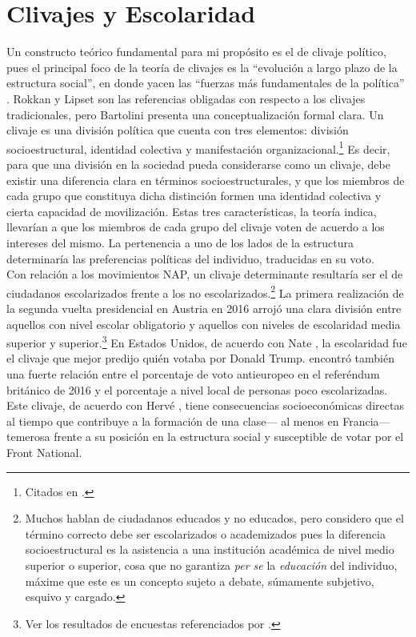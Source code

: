 \section{Clivajes y Escolaridad}

Un constructo teórico fundamental para mi propósito es el de clivaje político, pues el principal foco de la teoría de clivajes es la ``evolución a largo plazo de la estructura social'', en donde yacen las ``fuerzas más fundamentales de la política'' \parencite[4]{Bornschier09}. Rokkan y Lipset son las referencias obligadas con respecto a los clivajes tradicionales, pero Bartolini presenta una conceptualización formal clara. Un clivaje es una división política que cuenta con tres elementos: división socioestructural, identidad colectiva y manifestación organizacional.\footnote{Citados en \textcite{Bornschier09}.} Es decir, para que una división en la sociedad pueda considerarse como un clivaje, debe existir una diferencia clara en términos socioestructurales, y que los miembros de cada grupo que constituya dicha distinción formen una identidad colectiva y cierta capacidad de movilización. Estas tres características, la teoría indica, llevarían a que los miembros de cada grupo del clivaje voten de acuerdo a los intereses del mismo. La pertenencia a uno de los lados de la estructura determinaría las preferencias políticas del individuo, traducidas en su voto.\\

Con relación a los movimientos NAP, un clivaje determinante resultaría ser el de ciudadanos escolarizados frente a los no escolarizados.\footnote{Muchos hablan de ciudadanos educados y no educados, pero considero que el término correcto debe ser escolarizados o academizados pues la diferencia socioestructural es la asistencia a una institución académica de nivel medio superior o superior, cosa que no garantiza \textit{per se} la \textit{educación} del individuo, máxime que este es un concepto sujeto a debate, súmamente subjetivo, esquivo y cargado.} La primera realización de la segunda vuelta presidencial en Austria en 2016 arrojó una clara división entre aquellos con nivel escolar obligatorio y aquellos con niveles de escolaridad media superior y superior.\footnote{Ver los resultados de encuestas referenciados por \textcite{Hoare16}.} En Estados Unidos, de acuerdo con Nate \textcite{Silver16}, la escolaridad fue el clivaje que mejor predijo quién votaba por Donald Trump. \textcite{Rae16} encontró también una fuerte relación entre el porcentaje de voto antieuropeo en el referéndum británico de 2016 y el porcentaje a nivel local de personas poco escolarizadas. Este clivaje, de acuerdo con Hervé \textcite[cap. VII \textit{Le pari}]{LeBras15}, tiene consecuencias socioeconómicas directas al tiempo que contribuye a la formación de una clase--- al menos en Francia--- temerosa frente a su posición en la estructura social y susceptible de votar por el Front National. 

